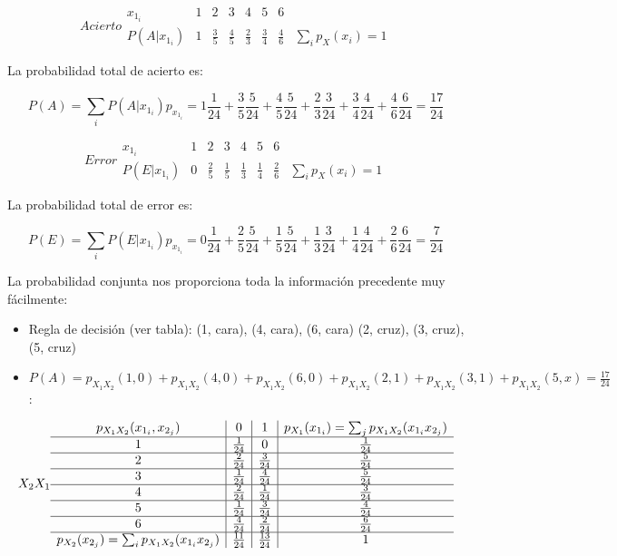 \documentclass[11pt]{article}
\providecommand{\tightlist}{%
      \setlength{\itemsep}{0pt}\setlength{\parskip}{0pt}}
\begin{document}
\[
Acierto \begin{array}{c|cccccc|c}
  x_{1_i} & 1 & 2 & 3 & 4 & 5 & 6 &  \\ 
  \hline
    P(A | x_{1_i}) & 1 & \frac{3}{5} & \frac{4}{5} & \frac{2}{3} & \frac{3}{4} & \frac{4}{6} & \sum_i p_X(x_i)=1
 \end{array}
\]

La probabilidad total de acierto es:

\[P(A) = \sum_i P(A | x_{1_i}) p_{x_{1_i}} =  
1\frac{1}{24} + \frac{3}{5}\frac{5}{24} + \frac{4}{5}\frac{5}{24} + \frac{2}{3}\frac{3}{24} + \frac{3}{4}\frac{4}{24} + \frac{4}{6}\frac{6}{24} =\frac{17}{24}\]

    \[
Error \begin{array}{c|cccccc|c}
  x_{1_i} & 1 & 2 & 3 & 4 & 5 & 6 &  \\ 
  \hline
    P(E | x_{1_i}) & 0 & \frac{2}{5} & \frac{1}{5} & \frac{1}{3} & \frac{1}{4} & \frac{2}{6} & \sum_i p_X(x_i)=1
 \end{array}
\]

La probabilidad total de error es:

\[P(E) = \sum_i P(E | x_{1_i}) p_{x_{1_i}} =  
0\frac{1}{24} + \frac{2}{5}\frac{5}{24} + \frac{1}{5}\frac{5}{24} + \frac{1}{3}\frac{3}{24} + \frac{1}{4}\frac{4}{24} + \frac{2}{6}\frac{6}{24} =\frac{7}{24}\]

    La probabilidad conjunta nos proporciona toda la información precedente
muy fácilmente:

\begin{itemize}
\tightlist
\item
  Regla de decisión (ver tabla): (1, cara), (4, cara), (6, cara) (2,
  cruz), (3, cruz), (5, cruz)
\item
  \(P(A) = p_{X_1X_2}(1,0)+p_{X_1X_2}(4,0)+p_{X_1X_2}(6,0)+p_{X_1X_2}(2,1)+p_{X_1X_2}(3,1)+p_{X_1X_2}(5,x)=\frac{17}{24}\):
\end{itemize}

\[
X_2 \\X_1 \begin{array}{c|c|c|c}
p_{X_1X_2}(x_{1_i}, x_{2_j}) & 0 & 1 & p_{X_1}(x_{1_i}) = \sum_j p_{X_1X_2}(x_{1_i}x_{2_j})\\
\hline
1 & \frac{1}{24} & 0 & \frac{1}{24}\\
\hline
2 & \frac{2}{24} & \frac{3}{24} & \frac{5}{24}\\
\hline
3 & \frac{1}{24} & \frac{4}{24} & \frac{5}{24}\\
\hline
4 & \frac{2}{24} & \frac{1}{24} & \frac{3}{24}\\
\hline
5 & \frac{1}{24} & \frac{3}{24} & \frac{4}{24}\\
\hline
6 & \frac{4}{24} & \frac{2}{24} & \frac{6}{24}\\
\hline
p_{X_2}(x_{2_j}) = \sum_i p_{X_1X_2}(x_{1_i}x_{2_j}) & \frac{11}{24} & \frac{13}{24} & 1
\end{array}
\]
\end{document}
